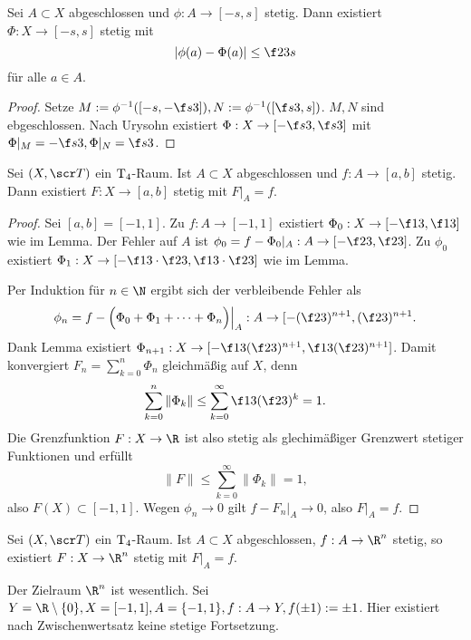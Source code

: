 \begin{lem}
	Sei $A \subset X$ abgeschlossen und $\phi: A \to [-s, s]$ stetig.
	Dann existiert $\Phi: X \to [-s, s]$ stetig mit
	\[
		|\phi(a) - \Phi(a)| \le \f 23 s
	\]
	für alle $a \in A$.
	\begin{proof}
		Setze $M := \phi^{-1}([-s, - \f s3]), N := \phi^{-1}([\f s3, s])$.
		$M, N$ sind ebgeschlossen.
		Nach Urysohn existiert $\Phi: X \to [-\f s3, \f s3]$ mit $\Phi|_M = - \f s3, \Phi|_N = \f s3$.
	\end{proof}
\end{lem}

\begin{st}[Tietze]
	Sei $(X, \scr T)$ ein $\mathrm{T_{4}}$-Raum.
	Ist $A \subset X$ abgeschlossen und $f: A \to [a,b]$ stetig.
	Dann existiert $F: X \to [a,b]$ stetig mit $F|_A = f$.
	\begin{proof}
		Sei \oBdA $[a,b] = [-1,1]$.
		Zu $f: A \to [-1,1]$ existiert $\Phi_0 : X \to [-\f 13, \f 13]$ wie im Lemma.
		Der Fehler auf $A$ ist $\phi_0 = f - \Phi_0|_A : A \to [-\f 23, \f 23]$.
		Zu $\phi_0$ existiert $\Phi_1: X \to [-\f 13 \cdot \f 23, \f 13 \cdot \f 23]$ wie im Lemma. %

		Per Induktion für $n \in \N$ ergibt sich der verbleibende Fehler als
		\[
			\phi_n = f - \Big( \Phi_0 + \Phi_1 + \dotsb + \Phi_n \Big)\Big|_A
			: A \to [-(\f 23)^{n+1}, (\f 23)^{n+1}.
		\]
		Dank Lemma existiert $\Phi_{n+1}: X \to [-\f 13(\f 23)^{n+1}, \f 13 (\f 23)^{n+1}]$.
		Damit konvergiert $F_n = \sum_{k=0}^n \Phi_n$ gleichmäßig auf $X$, denn
		\[
			\sum_{k=0}^n \|\Phi_k\|
			\le \sum_{k=0}^\infty \f 13 (\f 23)^k
			= 1.
		\]
		Die Grenzfunktion $F: X \to \R$ ist also stetig als glechimäßiger Grenzwert stetiger Funktionen und erfüllt
		\[
			\|F\| \le \sum_{k=0}^\infty \|\Phi_k\| = 1,
		\]
		also $F(X) \subset [-1, 1]$.
		Wegen $\phi_n \to 0$ gilt $f - F_n|_A \to 0$, also $F|_A = f$.
	\end{proof}
\end{st}

\begin{kor}
	Sei $(X, \scr T)$ ein $\mathrm{T_{4}}$-Raum.
	Ist $A \subset X$ abgeschlossen, $f: A \to \R^n$ stetig, so existiert $F: X \to \R^n$ stetig mit $F|_A = f$.
	\begin{note}
		Der Zielraum $\R^n$ ist wesentlich.
		Sei $Y = \R \setminus \{0\}, X = [-1,1], A = \{-1, 1\}, f: A \to Y, f(\pm 1) := \pm 1$.
		Hier existiert nach Zwischenwertsatz keine stetige Fortsetzung.
	\end{note}
\end{kor}

